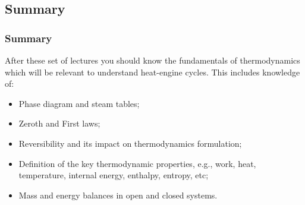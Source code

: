 \documentclass[10pt,compress]{beamer}
\begin{document}
\subsection{Summary}
\begin{frame}
 \frametitle{Summary}
After these set of lectures you should know the fundamentals of thermodynamics which will be relevant to understand heat-engine cycles. This includes knowledge of: 
 \begin{itemize}
  \item <2-> Phase diagram and steam tables;
  \item <3-> Zeroth and First laws;
  \item <4-> Reversibility and its impact on thermodynamics formulation;
  \item <5-> Definition of the key thermodynamic properties, e.g., work, heat, temperature, internal energy, enthalpy, entropy, etc;
  \item <6-> Mass and energy balances in open and closed systems.
 \end{itemize}
\end{frame}

 


%  
\end{document}
